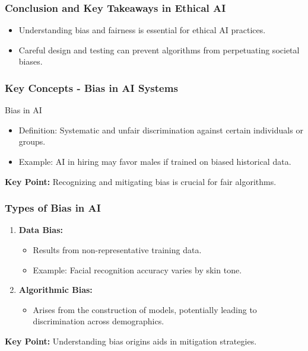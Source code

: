 \documentclass{beamer}
\begin{document}
\begin{frame}[fragile]
    \frametitle{Conclusion and Key Takeaways in Ethical AI}
    \begin{itemize}
        \item Understanding bias and fairness is essential for ethical AI practices.
        \item Careful design and testing can prevent algorithms from perpetuating societal biases.
    \end{itemize}
\end{frame}

\begin{frame}[fragile]
    \frametitle{Key Concepts - Bias in AI Systems}
    \begin{block}{Bias in AI}
        \begin{itemize}
            \item Definition: Systematic and unfair discrimination against certain individuals or groups.
            \item Example: AI in hiring may favor males if trained on biased historical data.
        \end{itemize}
    \end{block}
    \textbf{Key Point:} Recognizing and mitigating bias is crucial for fair algorithms.
\end{frame}

\begin{frame}[fragile]
    \frametitle{Types of Bias in AI}
    \begin{enumerate}
        \item \textbf{Data Bias:}
          \begin{itemize}
              \item Results from non-representative training data.
              \item Example: Facial recognition accuracy varies by skin tone.
          \end{itemize}
        \item \textbf{Algorithmic Bias:}
          \begin{itemize}
              \item Arises from the construction of models, potentially leading to discrimination across demographics.
          \end{itemize}
    \end{enumerate}
    \textbf{Key Point:} Understanding bias origins aids in mitigation strategies.
\end{frame}
\end{document}
